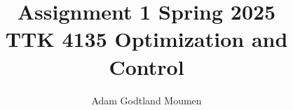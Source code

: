 \documentclass[11pt,a4paper]{article}
\title{Assignment 1 Spring 2025\\ \normalsize TTK 4135 Optimization and Control}
\author{Adam Godtland Moumen}
\begin{document}
\setlength{\parindent}{0cm}
\begin{titlepage}
    \maketitle
\end{titlepage}
\tableofcontents
\clearpage
{}


\end{document}
